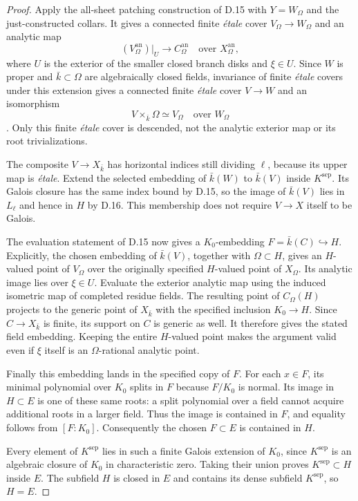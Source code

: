 \begin{proof}
Apply the all-sheet patching construction of D.15 with
$Y=W_\Omega$ and the just-constructed collars. It gives a
connected finite \emph{\'etale} cover
$V_\Omega\to W_\Omega$ and an analytic map
\[
                  (V_\Omega^{\mathrm{an}})|_U
                          \longrightarrow C_\Omega^{\mathrm{an}}
                         \quad\text{over }X_\Omega^{\mathrm{an}},
\]
where $U$ is the exterior of the smaller closed branch disks
and $\xi\in U$.
Since $W$ is proper and $\bar k\subset\Omega$ are algebraically
closed fields, invariance of finite \emph{\'etale} covers under
this extension gives a connected finite \emph{\'etale} cover
$V\to W$ and an isomorphism
\[
                         V\times_{\bar k}\Omega\simeq V_\Omega
                                  \quad\text{over }W_\Omega
\]
\citep[Expos\'e~X, Corollary~1.8]{E_SGA1}.
Only this finite \emph{\'etale} cover is descended, not the
analytic exterior map or its root trivializations.

The composite $V\to X_{\bar k}$ has horizontal indices
still dividing $\ell$, because its upper map is \emph{\'etale}.
Extend the selected embedding of $\bar k(W)$ to
$\bar k(V)$ inside $K^{\mathrm{sep}}$.
Its Galois closure has the same index bound by D.15, so the
image of $\bar k(V)$ lies in $L_\ell$ and hence in $H$ by D.16.
This membership does not require $V\to X$ itself to be Galois.

The evaluation statement of D.15 now gives a $K_0$-embedding
$F=\bar k(C)\hookrightarrow H$. Explicitly, the chosen
embedding of $\bar k(V)$, together with $\Omega\subset H$,
gives an $H$-valued point of $V_\Omega$ over the originally
specified $H$-valued point of $X_\Omega$. Its analytic image
lies over $\xi\in U$. Evaluate the exterior analytic map
using the induced isometric map of completed residue fields.
The resulting point of $C_\Omega(H)$ projects to the generic
point of $X_{\bar k}$ with the specified inclusion $K_0\to H$.
Since $C\to X_{\bar k}$ is finite, its support on $C$ is
generic as well. It therefore gives the stated field embedding.
Keeping the entire $H$-valued point makes the argument valid
even if $\xi$ itself is an $\Omega$-rational analytic point.

Finally this embedding lands in the specified copy of $F$.
For each $x\in F$, its minimal polynomial over $K_0$ splits
in $F$ because $F/K_0$ is normal. Its image in $H\subset E$
is one of these same roots: a split polynomial over a field
cannot acquire additional roots in a larger field. Thus the
image is contained in $F$, and equality follows from
$[F:K_0]$. Consequently the chosen $F\subset E$ is contained
in $H$.

Every element of $K^{\mathrm{sep}}$ lies in such a finite
Galois extension of $K_0$, since $K^{\mathrm{sep}}$ is an
algebraic closure of $K_0$ in characteristic zero. Taking their
union proves $K^{\mathrm{sep}}\subset H$ inside $E$.
The subfield $H$ is closed in $E$ and contains its dense subfield
$K^{\mathrm{sep}}$, so $H=E$.
\end{proof}
